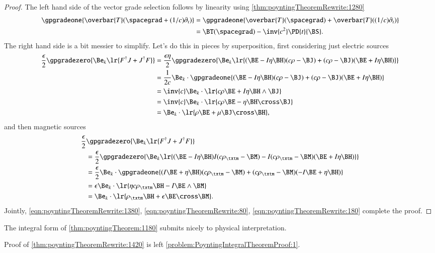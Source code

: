 \begin{proof}
The left hand side of the vector grade selection follows by linearity using \cref{thm:poyntingTheoremRewrite:1280}
\begin{equation}\label{eqn:poyntingTheoremRewrite:1380}
\begin{aligned}
\gpgradeone{ \overbar{T}(\spacegrad + (1/c)\partial_t) }
&= \gpgradeone{ \overbar{T}(\spacegrad) + \overbar{T}((1/c)\partial_t) } \\
&= \BT(\spacegrad) - \inv{c^2} \PD{t}{\BS}.
\end{aligned}
\end{equation}
The right hand side is a bit messier to simplify.
Let's do this in pieces by superposition, first considering just electric sources
\begin{equation}\label{eqn:poyntingTheoremRewrite:80}
\begin{aligned}
\frac{\epsilon}{2} \gpgradezero{ \Be_k \lr{ F^\dagger J + J^\dagger F} }
&= \frac{\epsilon \eta}{2} \gpgradezero{ \Be_k \lr{ (\BE - I \eta \BH)(c \rho - \BJ)  + (c \rho - \BJ)( \BE + I \eta \BH )} } \\
&= \frac{1}{2c } \Be_k \cdot \gpgradeone{ (\BE - I \eta \BH)(c \rho - \BJ)  + (c \rho - \BJ)( \BE + I \eta \BH ) } \\
&= \inv{c} \Be_k \cdot \lr{ c \rho \BE + I \eta \BH \wedge \BJ } \\
&= \inv{c} \Be_k \cdot \lr{ c \rho \BE - \eta \BH \cross \BJ } \\
&= \Be_k \cdot \lr{ \rho \BE + \mu \BJ \cross \BH },
\end{aligned}
\end{equation}
and then magnetic sources
\begin{equation}\label{eqn:poyntingTheoremRewrite:180}
\begin{aligned}
\frac{\epsilon}{2 } &\gpgradezero{ \Be_k \lr{ F^\dagger J + J^\dagger F} } \\
&= \frac{\epsilon }{2} \gpgradezero{ \Be_k \lr{ (\BE - I \eta \BH) I (c \rho_\txtm - \BM)  - I (c \rho_\txtm - \BM)( \BE + I \eta \BH )} } \\
&= \frac{\epsilon }{2} \Be_k \cdot \gpgradeone{ (I \BE + \eta \BH)(c \rho_\txtm - \BM)  + (c \rho_\txtm - \BM)( -I \BE + \eta \BH )} \\
&= \epsilon \Be_k \cdot \lr{ \eta c \rho_\txtm \BH - I \BE \wedge \BM } \\
&= \Be_k \cdot \lr{ \rho_\txtm \BH + \epsilon \BE \cross \BM }.
\end{aligned}
\end{equation}
Jointly,
\cref{eqn:poyntingTheoremRewrite:1380}, \cref{eqn:poyntingTheoremRewrite:80}, \cref{eqn:poyntingTheoremRewrite:180} complete the proof.
\end{proof}
The integral form of \cref{thm:poyntingTheorem:1180} submits nicely to physical interpretation.

Proof of
\cref{thm:poyntingTheoremRewrite:1420}
is left \cref{problem:PoyntingIntegralTheoremProof:1}.

